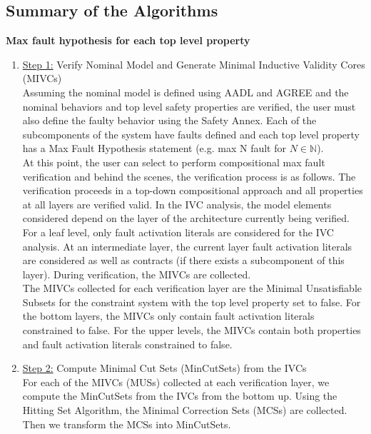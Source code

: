 \subsection{Summary of the Algorithms}

\textbf{Max fault hypothesis for each top level property}
\begin{enumerate}[label=(\roman*)]
\item \underline{Step 1:} Verify Nominal Model and Generate Minimal Inductive Validity Cores (MIVCs) \\

Assuming the nominal model is defined using AADL and AGREE and the nominal behaviors and top level safety properties are verified, the user must also define the faulty behavior using the Safety Annex. Each of the subcomponents of the system have faults defined and each top level property has a Max Fault Hypothesis statement (e.g. max N fault for $N \in \mathbb{N}$). \\

At this point, the user can select to perform compositional max fault verification and behind the scenes, the verification process is as follows. The verification proceeds in a top-down compositional approach and all properties at all layers are verified valid. In the IVC analysis, the model elements considered depend on the layer of the architecture currently being verified. For a leaf level, only fault activation literals are considered for the IVC analysis. At an intermediate layer, the current layer fault activation literals are considered as well as contracts (if there exists a subcomponent of this layer). During verification, the MIVCs are collected.  \\

The MIVCs collected for each verification layer are the Minimal Unsatisfiable Subsets for the constraint system with the top level property set to false. For the bottom layers, the MIVCs only contain fault activation literals constrained to false. For the upper levels, the MIVCs contain both properties and fault activation literals constrained to false. \\

\item \underline{Step 2:} Compute Minimal Cut Sets (MinCutSets) from the IVCs \\

For each of the MIVCs (MUSs) collected at each verification layer, we compute the MinCutSets from the IVCs from the bottom up. Using the Hitting Set Algorithm, the Minimal Correction Sets (MCSs) are collected. Then we transform the MCSs into MinCutSets.   \\ %


\end{enumerate}
